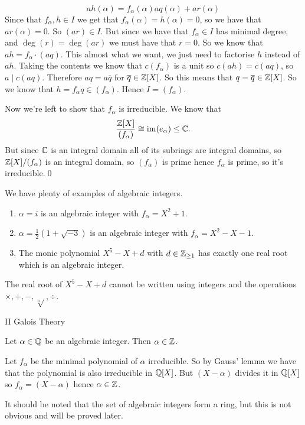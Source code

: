 \documentclass{article}
\begin{document}
\[
  ah(\alpha)=f_\alpha(\alpha)aq(\alpha)+ar(\alpha)
\]
Since that $ f_\alpha,h\in I $ we get that $ f_\alpha(\alpha)=h(\alpha)=0 $, so we have that $ ar(\alpha)=0 $. So $ (ar)\in I $. But since we have that $ f_\alpha\in I $ has minimal degree, and $ \deg(r)=\deg(ar) $ we must have that $ r=0 $. So we know that $ ah=f_\alpha\cdot (aq) $. This almost what we want, we just need to factorise $ h $ instead of $ ah $. Taking the contents we know that $ c(f_\alpha) $ is a unit so $ c(ah)=c(aq) $, so $ a\mid c(aq) $. Therefore $ aq=a\overline q $ for $ \overline q\in \mathbb{Z}[X] $. So this means that $ q=\overline q\in \mathbb{Z}[X] $. So we know that $ h=f_\alpha q\in (f_\alpha) $. Hence $ I=(f_\alpha) $.\par
Now we're left to show that $ f_\alpha $ is irreducible. We know that
\[
	\frac{\mathbb{Z}[X]}{(f_\alpha)}\cong\operatorname{im}(e_\alpha)\le \mathbb{C}.
\]
But since $ \mathbb{C} $ is an integral domain all of its subrings are integral domains, so $ \mathbb{Z}[X]/(f_\alpha) $ is an integral domain, so $ (f_\alpha) $ is prime hence $ f_\alpha $ is prime, so it's irreducible.\qed\par
We have plenty of examples of algebraic integers.
\begin{enumerate}
	\item $ \alpha=i $ is an algebraic integer with $ f_\alpha=X^2+1 $.
	\item $ \alpha=\frac 12(1+\sqrt{-3}) $ is an algebraic integer with $ f_\alpha=X^2-X-1 $.
	\item The monic polynomial $ X^5-X+d $ with $ d\in \mathbb{Z}_{\ge 1} $ has exactly one real root which is an algebraic integer.
\end{enumerate}
\begin{theorem}
	The real root of $ X^5-X+d $ cannot be written using integers and the operations $ \times, +,-,\sqrt[n]{},\div $.
\end{theorem}
\pf II Galois Theory
\begin{proposition}
  Let $ \alpha\in \mathbb{Q} $ be an algebraic integer. Then $ \alpha\in \mathbb{Z} $.
\end{proposition}
\pf Let $ f_\alpha $ be the minimal polynomial of $ \alpha $ irreducible. So by Gauss' lemma we have that the polynomial is also irreducible in $ \mathbb{Q}[X] $. But $ (X-\alpha) $ divides it in $ \mathbb{Q}[X] $ so $ f_\alpha=(X-\alpha) $ hence $ \alpha\in\mathbb{Z} $.\par
It should be noted that the set of algebraic integers form a ring, but this is not obvious and will be proved later.
\end{document}
